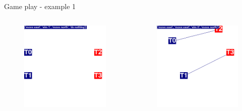 \documentclass{beamer}
\begin{document}
\begin{frame}{Game play - example 1}
\begin{columns}
\begin{figure}[htp]
  \centering
  \includegraphics[width=\textwidth]{images/animation03/screenshot01.png}
\end{figure}
\begin{figure}[htp]
  \centering
  \includegraphics[width=\textwidth]{images/animation03/screenshot04.png}
\end{figure}


\end{columns}
\end{frame}
\end{document}
